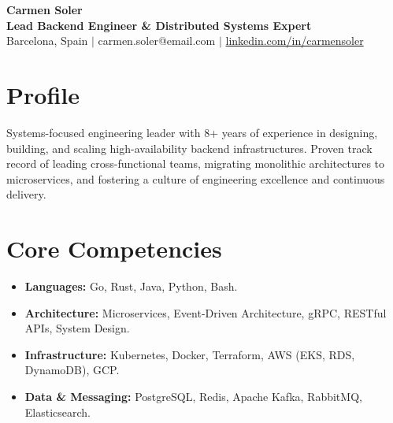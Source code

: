\documentclass[11pt, a4paper]{article}
\begin{document}
\pagestyle{empty}

\begin{flushleft}
    {\Huge \textbf{Carmen Soler}} \\
    \vspace{1ex}
    \textbf{Lead Backend Engineer \& Distributed Systems Expert} \\
    \vspace{0.5ex}
    Barcelona, Spain $|$ carmen.soler@email.com $|$ \href{https://linkedin.com/in/carmensoler}{linkedin.com/in/carmensoler}
\end{flushleft}

\vspace{-2ex}
\section*{Profile}
Systems-focused engineering leader with 8+ years of experience in designing, building, and scaling high-availability backend infrastructures. Proven track record of leading cross-functional teams, migrating monolithic architectures to microservices, and fostering a culture of engineering excellence and continuous delivery.

\section*{Core Competencies}
\begin{itemize}[leftmargin=0.2in, label={-}, nosep, itemsep=2pt]
    \item \textbf{Languages:} Go, Rust, Java, Python, Bash.
    \item \textbf{Architecture:} Microservices, Event-Driven Architecture, gRPC, RESTful APIs, System Design.
    \item \textbf{Infrastructure:} Kubernetes, Docker, Terraform, AWS (EKS, RDS, DynamoDB), GCP.
    \item \textbf{Data \& Messaging:} PostgreSQL, Redis, Apache Kafka, RabbitMQ, Elasticsearch.
\end{itemize}
\end{document}
